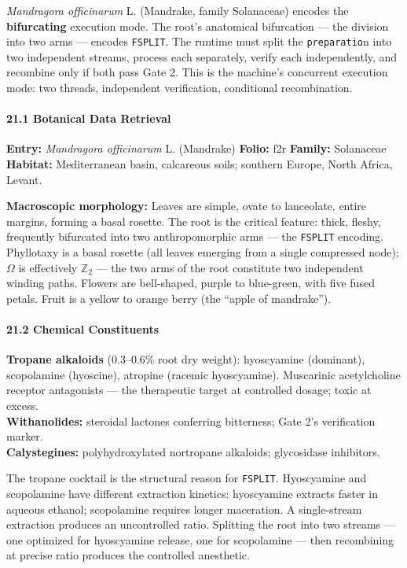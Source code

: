 \documentclass[12pt,a4paper]{article}
\begin{document}
\emph{Mandragora officinarum} L. (Mandrake, family Solanaceae) encodes
the \textbf{bifurcating} execution mode. The root's anatomical
bifurcation --- the division into two arms --- encodes \texttt{FSPLIT}.
The runtime must split the \texttt{preparatio}n into two independent
streams, process each separately, verify each independently, and
recombine only if both pass Gate 2. This is the machine's concurrent
execution mode: two threads, independent verification, conditional
recombination.

\hypertarget{botanical-data-retrieval-1}{%
\paragraph{21.1 Botanical Data
Retrieval}\label{botanical-data-retrieval-1}}

\textbf{Entry:} \emph{Mandragora officinarum} L. (Mandrake)
\textbf{Folio:} f2r \textbf{Family:} Solanaceae \textbf{Habitat:}
Mediterranean basin, calcareous soils; southern Europe, North Africa,
Levant.

\textbf{Macroscopic morphology:} Leaves are simple, ovate to lanceolate,
entire margins, forming a basal rosette. The root is the critical
feature: thick, fleshy, frequently bifurcated into two anthropomorphic
arms --- the \texttt{FSPLIT} encoding. Phyllotaxy is a basal rosette
(all leaves emerging from a single compressed node); \(\Omega\) is
effectively \(\mathbb{Z}_2\) --- the two arms of the root constitute two
independent winding paths. Flowers are bell-shaped, purple to
blue-green, with five fused petals. Fruit is a yellow to orange berry
(the ``apple of mandrake'').

\hypertarget{chemical-constituents-1}{%
\paragraph{21.2 Chemical Constituents}\label{chemical-constituents-1}}

\textbf{Tropane alkaloids} (0.3--0.6\% root dry weight): hyoscyamine
(dominant), scopolamine (hyoscine), atropine (racemic hyoscyamine).
Muscarinic acetylcholine receptor antagonists --- the therapeutic target
at controlled dosage; toxic at excess.\\
\textbf{Withanolides:} steroidal lactones conferring bitterness; Gate
2's verification marker.\\
\textbf{Calystegines:} polyhydroxylated nortropane alkaloids;
glycosidase inhibitors.

The tropane cocktail is the structural reason for \texttt{FSPLIT}.
Hyoscyamine and scopolamine have different extraction kinetics:
hyoscyamine extracts faster in aqueous ethanol; scopolamine requires
longer maceration. A single-stream extraction produces an uncontrolled
ratio. Splitting the root into two streams --- one optimized for
hyoscyamine release, one for scopolamine --- then recombining at precise
ratio produces the controlled anesthetic.
\end{document}
